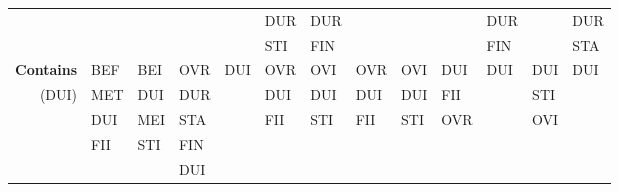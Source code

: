 \documentclass[11pt]{report}
\newenvironment{vvarmargin}[2]
{
  \begin{list}{}
  {
    \setlength{\topsep}{0pt}
    \setlength{\leftmargin}{0pt}
    \setlength{\rightmargin}{0pt}
    \setlength{\listparindent}{\parindent}
    \setlength{\itemindent}{\parindent}
    \setlength{\parsep}{0pt plus 1pt}
    \addtolength{\leftmargin}{#1}\addtolength{\rightmargin}{#2}
  }
  \item
}
{
  \end{list}
}
\begin{document}
\begin{table}[p]
\begin{vvarmargin}{-4cm}{-4cm}
\begin{center}
\begin{tabular}[t]{|r|l|l|l|l|l|l|l|l|l|l|l|l|}
                                        &                         &                         &                         &                         & DUR                     & DUR                     &                         &                         &                         & DUR                     &                         & DUR                     \\
                                        &                         &                         &                         &                         & STI                     & FIN                     &                         &                         &                         & FIN                     &                         & STA                     \\
                \hline
                \textbf{Contains}       & BEF                     & BEI                     & OVR                     & DUI                     & OVR                     & OVI                     & OVR                     & OVI                     & DUI                     & DUI                     & DUI                     & DUI                     \\
                (DUI)                   & MET                     & DUI                     & DUR                     &                         & DUI                     & DUI                     & DUI                     & DUI                     & FII                     &                         & STI                     &                         \\
                                        & DUI                     & MEI                     & STA                     &                         & FII                     & STI                     & FII                     & STI                     & OVR                     &                         & OVI                     &                         \\
                                        & FII                     & STI                     & FIN                     &                         &                         &                         &                         &                         &                         &                         &                         &                         \\
                                        &                         &                         & DUI                     &                         &                         &                         &                         &                         &                         &                         &                         &                         \\

\end{tabular}
\end{center}
\end{vvarmargin}
\end{table}
\end{document}
